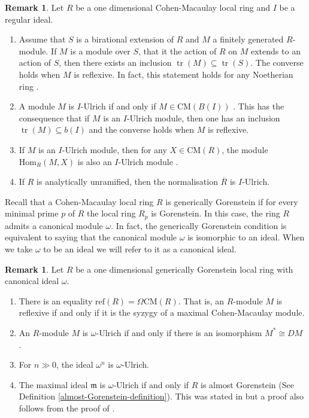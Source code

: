\documentclass[12pt]{amsart}
\newcommand{\Hom}{\mathrm{Hom}}
\newcommand{\m}{\mathfrak{m}}
\newcommand{\CM}{\mathrm{CM}}
\newcommand{\reflexive}{\mathrm{ref}}
\theoremstyle{definition}
\newtheorem{remark}[theorem]{Remark}
\numberwithin{equation}{theorem}
\DeclareMathOperator{\tr}{\mathrm{tr}}
\begin{document}
\begin{remark}\label{i-ulrich-modules}
    Let $R$ be a one dimensional Cohen-Macaulay local ring and $I$ be a regular ideal. 
    \begin{enumerate}
        \item Assume that $S$ is a birational extension of $R$ and $M$ a finitely generated $R$-module. If $M$ is a module over $S$, that it the action of $R$ on $M$ extends to an action of $S$, then there exists an inclusion $\tr(M) \subseteq \tr(S)$. The converse holds when $M$ is reflexive. In fact, this statement holds for any Noetherian ring \cite[Theorem 2.9]{Dao-Maitra-Sridhar}.
        \item A module $M$ is $I$-Ulrich if and only if $M \in \CM(B(I))$ \cite[Theorem 4.6]{Dao-Maitra-Sridhar}. This has the consequence that if $M$ is an $I$-Ulrich module, then one has an inclusion $\tr(M) \subseteq b(I)$ and the converse holds when $M$ is reflexive.
        \item If $M$ is an $I$-Ulrich module, then for any $X \in \CM(R)$, the module $\Hom_R(M,X)$ is also an $I$-Ulrich module \cite[Lemma 4.15]{Dao-Maitra-Sridhar}.
        \item If $R$ is analytically unramified, then the normalisation $\overline{R}$ is $I$-Ulrich.
    \end{enumerate}
\end{remark}
Recall that a Cohen-Macaulay local ring $R$ is generically Gorenstein if for every minimal prime $p$ of $R$ the local ring $R_p$ is Gorenstein. In this case, the ring $R$ admits a canonical module $\omega$. In fact, the generically Gorenstein condition is equivalent to saying that the canonical module $\omega$ is isomorphic to an ideal. When we take $\omega$ to be an ideal we will refer to it as a canonical ideal. 
\begin{remark}\label{omega-Ulrich-remarks}
    Let $R$ be a one dimensional generically Gorenstein local ring with canonical ideal $\omega$.
    \begin{enumerate}
        \item There is an equality $\reflexive(R) = \Omega \CM(R)$. That is, an $R$-module $M$ is reflexive if and only if it is the syzygy of a maximal Cohen-Macaulay module.
        \item An $R$-module $M$ is $\omega$-Ulrich if and only if there is an isomorphism $M^* \cong DM$ \cite[Corollary 4.27]{Dao-Maitra-Sridhar}.
        \item For $n \gg 0$, the ideal $\omega^n$ is $\omega$-Ulrich. 
        \item The maximal ideal $\m$ is $\omega$-Ulrich if and only if $R$ is almost Gorenstein (See Definition \ref{almost-Gorenstein-definition}). This was stated in \cite[Proposition 7.2]{Dao-Maitra-Sridhar} but a proof also follows from the proof of \cite[Theorem 3.12]{Kumashiro}.
    \end{enumerate}
\end{remark}
\end{document}
